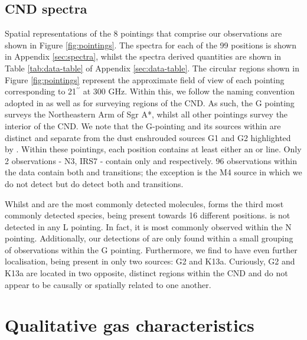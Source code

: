 \documentclass[twocolumn]{aastex631}
\begin{document}
\subsection{CND spectra}

Spatial representations of the 8 pointings that comprise our observations are shown in Figure \ref{fig:pointings}. The spectra for each of the 99 positions is shown in Appendix \ref{sec:spectra}, whilst the spectra derived quantities are shown in Table \ref{tab:data-table} of Appendix \ref{sec:data-table}. The circular regions shown in Figure \ref{fig:pointings} represent the approximate field of view of each pointing corresponding to 21$^{\prime\prime}$ at 300 \si{\giga\hertz}.  Within this, we follow the naming convention adopted in \citet{Christopher2005} as well as \citet{sgrANamingConvention} for surveying regions of the CND. As such, the G pointing surveys the Northeastern Arm of Sgr A*, whilst all other pointings survey the interior of the CND. We note that the G-pointing and its sources within are distinct and separate from the dust enshrouded sources G1 and G2 highlighted by \citet{dustEnshroudedSources}. Within these pointings, each position contains at least either an  or  line. Only 2 observations - N3, IRS7 - contain only  and  respectively. 96 observations within the data contain both  and  transitions; the exception is the M4 source in which we do not detect  but do detect both  and  transitions.

Whilst  and  are the most commonly detected molecules,  forms the third most commonly detected species, being present towards 16 different positions.  is not detected in any L pointing. In fact, it is most commonly observed within the N pointing. Additionally, our detections of  are only found within a small grouping of observations within the G pointing. Furthermore, we find  to have even further localisation, being present in only two sources: G2 and K13a. Curiously, G2 and K13a are located in two opposite, distinct regions within the CND and do not appear to be causally or spatially related to one another.


\section{Qualitative gas characteristics} \label{sec:obs-discussion}
\end{document}
